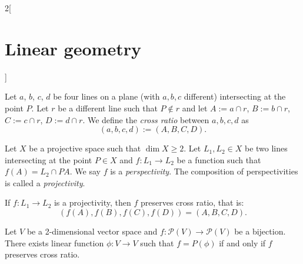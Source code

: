 \documentclass[../../../main.tex]{subfiles}
\begin{document}
\begin{multicols}{2}[\section{Linear geometry}]
  \begin{definition}
    Let $a$, $b$, $c$, $d$ be four lines on a plane (with $a,b,c$ different) intersecting at the point $P$. Let $r$ be a different line such that $P\notin r$ and let $A:=a\cap r$, $B:=b\cap r$, $C:=c\cap r$, $D:=d\cap r$. We define the \emph{cross ratio} between $a,b,c,d$ as $$(a,b,c,d):=(A,B,C,D).$$
  \end{definition}
  \begin{definition}
    Let $X$ be a projective space such that $\dim X\geq 2$. Let $L_1,L_2\in X$ be two lines intersecting at the point $P\in X$ and $f:L_1\rightarrow L_2$ be a function such that $f(A)=L_2\cap PA$. We say $f$ is a \emph{perspectivity}. The composition of perspectivities is called a \emph{projectivity}.
  \end{definition}
  \begin{theorem}
    If $f:L_1\rightarrow L_2$ is a projectivity, then $f$ preserves cross ratio, that is: $$(f(A),f(B),f(C),f(D))=(A,B,C,D).$$
  \end{theorem}
  \begin{theorem}
    Let $V$ be a 2-dimensional vector space and $f:\mathcal{P}(V)\rightarrow \mathcal{P}(V)$ be a bijection. There exists linear function $\phi:V\rightarrow V$ such that $f=P(\phi)$ if and only if $f$ preserves cross ratio.
  \end{theorem}

\end{multicols}
\end{document}
